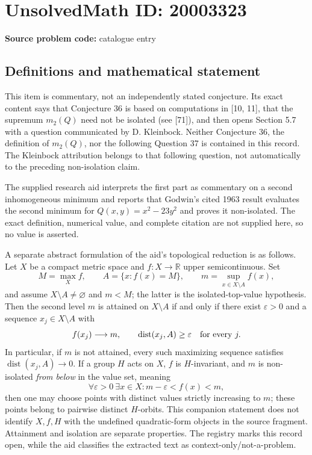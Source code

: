 \documentclass[11pt]{article}
\newcommand{\R}{\mathbb{R}}
\begin{document}
\section*{UnsolvedMath ID: 20003323}
\textbf{Source problem code:} catalogue entry
\subsection{Definitions and mathematical statement}
This item is commentary, not an independently stated conjecture. Its exact content says that Conjecture 36 is based on computations in [10, 11], that the supremum $m_2(Q)$ need not be isolated (see [71]), and then opens Section 5.7 with a question communicated by D. Kleinbock. Neither Conjecture 36, the definition of $m_2(Q)$, nor the following Question 37 is contained in this record. The Kleinbock attribution belongs to that following question, not automatically to the preceding non-isolation claim.

The supplied research aid interprets the first part as commentary on a second inhomogeneous minimum and reports that Godwin's cited 1963 result evaluates the second minimum for $Q(x,y)=x^2-23y^2$ and proves it non-isolated. The exact definition, numerical value, and complete citation are not supplied here, so no value is asserted.

A separate abstract formulation of the aid's topological reduction is as follows. Let $X$ be a compact metric space and $f:X\to\R$ upper semicontinuous. Set
\[
 M=\max_X f,\qquad A=\{x:f(x)=M\},\qquad
 m=\sup_{x\in X\setminus A} f(x),
\]
and assume $X\setminus A\ne\varnothing$ and $m<M$; the latter is the isolated-top-value hypothesis. Then the second level $m$ is attained on $X\setminus A$ if and only if there exist $\varepsilon>0$ and a sequence $x_j\in X\setminus A$ with
\[
 f(x_j)\longrightarrow m,\qquad
 \operatorname{dist}(x_j,A)\geq\varepsilon\quad\hbox{for every }j.
\]
In particular, if $m$ is not attained, every such maximizing sequence satisfies $\operatorname{dist}(x_j,A)\to0$. If a group $H$ acts on $X$, $f$ is $H$-invariant, and $m$ is non-isolated \emph{from below} in the value set, meaning
\[
 \forall\varepsilon>0\ \exists x\in X:
             m-\varepsilon<f(x)<m,
\]
then one may choose points with distinct values strictly increasing to $m$; these points belong to pairwise distinct $H$-orbits. This companion statement does not identify $X,f,H$ with the undefined quadratic-form objects in the source fragment. Attainment and isolation are separate properties. The registry marks this record open, while the aid classifies the extracted text as context-only/not-a-problem.
\end{document}
